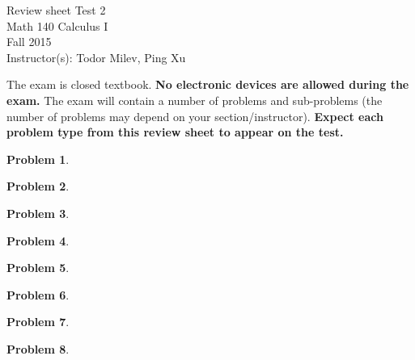 \documentclass{article}
\newtheorem{problem}{Problem}
\begin{document}
\begin{center}
\Large
Review sheet Test 2 \\ Math 140 Calculus I \\ \normalsize Fall 2015 \\ Instructor(s): Todor Milev, Ping Xu
\end{center}



\noindent The exam is closed textbook. \textbf{No electronic devices are allowed during the exam. } The exam will contain a number of problems and sub-problems (the number of problems may depend on your section/instructor). \textbf{Expect each problem type from this review sheet to appear on the test.}%

\begin{problem}

\end{problem}

\begin{problem}

\end{problem}
\begin{problem}

\end{problem}


\begin{problem}

\end{problem}


\begin{problem}

\end{problem}

\begin{problem}

\end{problem}




\begin{problem}


\end{problem}
\begin{problem}

\end{problem}


\end{document}
